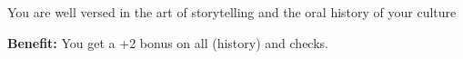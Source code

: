 
You are well versed in the art of storytelling and the oral history of your culture

\textbf{Benefit:} You get a +2 bonus on all  (history) and  checks.
